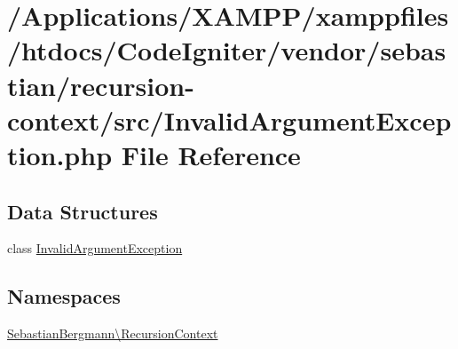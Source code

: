 \hypertarget{sebastian_2recursion-context_2src_2_invalid_argument_exception_8php}{}\section{/\+Applications/\+X\+A\+M\+P\+P/xamppfiles/htdocs/\+Code\+Igniter/vendor/sebastian/recursion-\/context/src/\+Invalid\+Argument\+Exception.php File Reference}
\label{sebastian_2recursion-context_2src_2_invalid_argument_exception_8php}
\subsection*{Data Structures}
\begin{DoxyCompactItemize}
\item 
class \mbox{\hyperlink{class_sebastian_bergmann_1_1_recursion_context_1_1_invalid_argument_exception}{Invalid\+Argument\+Exception}}
\end{DoxyCompactItemize}
\subsection*{Namespaces}
\begin{DoxyCompactItemize}
\item 
 \mbox{\hyperlink{namespace_sebastian_bergmann_1_1_recursion_context}{Sebastian\+Bergmann\textbackslash{}\+Recursion\+Context}}
\end{DoxyCompactItemize}

